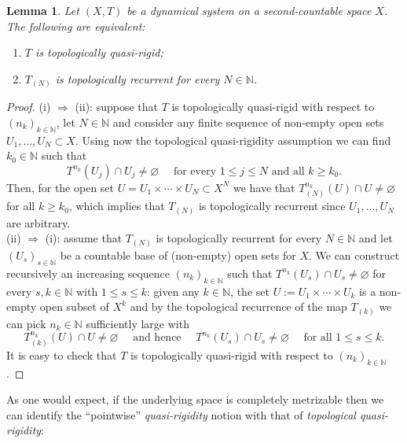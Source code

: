 \documentclass[openright,11pt]{article}
\theoremstyle{plain}
\newtheorem{lemma}[theorem]{Lemma}
\theoremstyle{definition}
\newcommand{\NN}{\mathbb{N}}
\begin{document}
\begin{lemma}\label{Lem:t.qr.2AN}
	Let $(X,T)$ be a dynamical system on a second-countable space $X$. The following are equivalent:
	\begin{enumerate}[{\em(i)}]
		\item $T$ is topologically quasi-rigid;
		
		\item $T_{(N)}$ is topologically recurrent for every $N \in \NN$.
	\end{enumerate}  
\end{lemma}
\begin{proof}
	(i) $\Rightarrow$ (ii): suppose that $T$ is topologically quasi-rigid with respect to $(n_k)_{k\in\NN}$, let $N \in \NN$ and consider any finite sequence of non-empty open sets $U_1,...,U_N \subset X$. Using now the topological quasi-rigidity assumption we can find $k_0 \in \NN$ such that
	\[
	T^{n_k}(U_j) \cap U_j \neq \varnothing \quad \text{ for every } 1\leq j\leq N \text{ and all } k\geq k_0.
	\]
	Then, for the open set $U=U_1\times\cdots\times U_N \subset X^N$ we have that $T_{(N)}^{n_k}(U) \cap U \neq \varnothing$ for all $k\geq k_0$, which implies that $T_{(N)}$ is topologically recurrent since $U_1,...,U_N$ are arbitrary.\\[-5pt]
	
	(ii) $\Rightarrow$ (i): assume that $T_{(N)}$ is topologically recurrent for every $N \in \NN$ and let $(U_s)_{s \in\NN}$ be a countable base of (non-empty) open sets for $X$. We can construct recursively an increasing sequence $(n_k)_{k\in\NN}$ such that $T^{n_k}(U_s) \cap U_s \neq \varnothing$ for every $s,k \in \NN$ with $1\leq s\leq k$: given any $k \in \NN$, the set $U:=U_1\times\cdots\times U_k$ is a non-empty open subset of $X^k$ and by the topological recurrence of the map $T_{(k)}$ we can pick $n_k \in \NN$ sufficiently large with
	\[
	T_{(k)}^{n_k}(U) \cap U \neq \varnothing \quad \text{ and hence } \quad T^{n_k}(U_s) \cap U_s \neq \varnothing \quad \text{ for all } 1\leq s \leq k.
	\]
	It is easy to check that $T$ is topologically quasi-rigid with respect to $(n_k)_{k\in\NN}$.
\end{proof}

As one would expect, if the underlying space is completely metrizable then we can identify the ``pointwise'' {\em quasi-rigidity} notion with that of {\em topological quasi-rigidity}:
\end{document}
